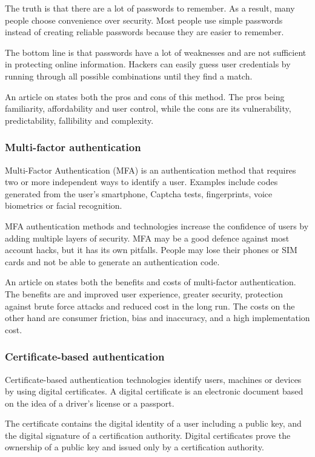 The truth is that there are a lot of passwords to remember. As a result, many people choose convenience over security. Most people use simple passwords instead of creating reliable passwords because they are easier to remember. 

The bottom line is that passwords have a lot of weaknesses and are not sufficient in protecting online information. Hackers can easily guess user credentials by running through all possible combinations until they find a match.

An article on \textcite{Descope2023} states both the pros and cons of this method. The pros being familiarity, affordability and user control, while the cons are its vulnerability, predictability, fallibility and complexity.

\subsubsection{Multi-factor authentication}

Multi-Factor Authentication (MFA) is an authentication method that requires two or more independent ways to identify a user. Examples include codes generated from the user’s smartphone, Captcha tests, fingerprints, voice biometrics or facial recognition. 

MFA authentication methods and technologies increase the confidence of users by adding multiple layers of security. MFA may be a good defence against most account hacks, but it has its own pitfalls. People may lose their phones or SIM cards and not be able to generate an authentication code.

An article on \textcite{Mitek2021} states both the benefits and costs of multi-factor authentication. The benefits are and improved user experience, greater security, protection against brute force attacks and reduced cost in the long run. The costs on the other hand are consumer friction, bias and inaccuracy, and a high implementation cost.

\subsubsection{Certificate-based authentication}

Certificate-based authentication technologies identify users, machines or devices by using digital certificates. A digital certificate is an electronic document based on the idea of a driver’s license or a passport. 

The certificate contains the digital identity of a user including a public key, and the digital signature of a certification authority. Digital certificates prove the ownership of a public key and issued only by a certification authority. 

